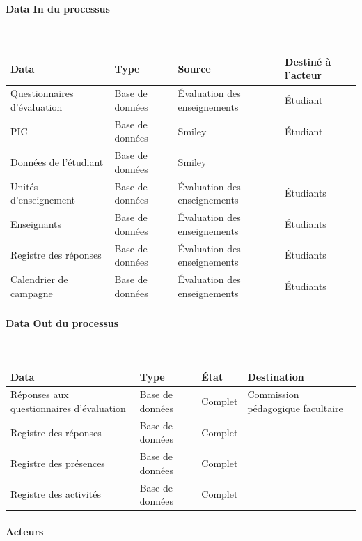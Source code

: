 \documentclass[a4paper,11pt]{report}
\begin{document}
\paragraph{Data In du processus}~\newline{}

\begin{tabularx}{\linewidth}{|X|X|X|X|} \hline
Data & Type & Source & Destiné à l'acteur \\ \hline
Questionnaires d'évaluation & Base de données & Évaluation des enseignements & Étudiant \\ 
PIC & Base de données & Smiley & Étudiant \\
Données de l'étudiant & Base de données & Smiley & \\
Unités d'enseignement & Base de données & Évaluation des enseignements & Étudiants \\
Enseignants & Base de données & Évaluation des enseignements & Étudiants \\
Registre des réponses & Base de données & Évaluation des enseignements & Étudiants \\
Calendrier de campagne & Base de données & Évaluation des enseignements & Étudiants \\

\hline
\end{tabularx}

\paragraph{Data Out du processus}~\newline{}

\begin{tabularx}{\linewidth}{|X|X|l|X|} \hline
Data & Type & État & Destination \\ \hline
Réponses aux questionnaires d'évaluation & Base de données & Complet & Commission pédagogique facultaire \\ 
Registre des réponses & Base de données & Complet & \\
Registre des présences & Base de données & Complet & \\
Registre des activités & Base de données & Complet & \\
\hline
\end{tabularx}

\paragraph{Acteurs}~\newline{}%
\end{document}
